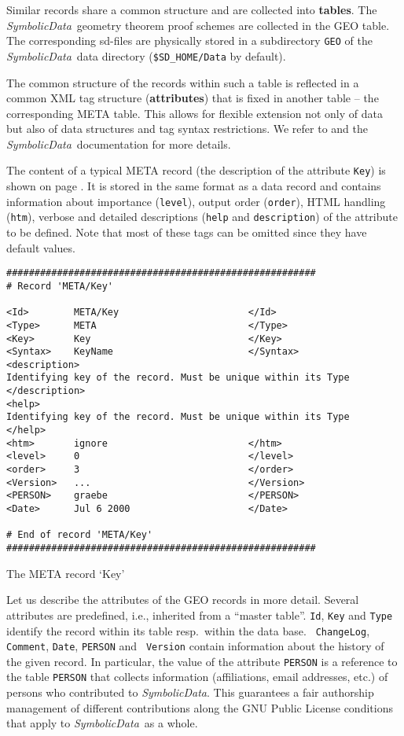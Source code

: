\documentclass[11pt]{article}
\newcommand{\SD}{{\it Symbo\-lic\-Data}}
\begin{document}
Similar records share a common structure and are collected into
{\bf tables}. The \SD\ geometry theorem proof schemes are
collected in the GEO table. The corresponding sd-files are
physically stored in a subdirectory {\tt GEO} of the \SD\ data
directory ({\tt \$SD\_HOME/Data} by default).

The common structure of the records within such a table is
reflected in a common XML tag structure ({\bf attributes}) that
is fixed in another table -- the corresponding META table. This
allows for flexible extension not only of data but also of data
structures and tag syntax restrictions.  We refer to
\cite{Bachmann_00a, karlsruhe-02} and the \SD\ documentation for
more details.  

The content of a typical META record (the description of the attribute
{\tt Key}) is shown on page \pageref{table:2}. It is stored in the
same format as a data record and contains information about importance
({\tt level}), output order ({\tt order}), HTML handling ({\tt htm}),
verbose and detailed descriptions ({\tt help} and {\tt description})
of the attribute to be defined. Note that most of these tags can be
omitted since they have default values.

\begin{table}[t]\label{table:2}{\small
\begin{verbatim}
#######################################################
# Record 'META/Key'

<Id>        META/Key                       </Id>
<Type>      META                           </Type>
<Key>       Key                            </Key>
<Syntax>    KeyName                        </Syntax>
<description>
Identifying key of the record. Must be unique within its Type
</description>
<help>
Identifying key of the record. Must be unique within its Type
</help>
<htm>       ignore                         </htm>
<level>     0                              </level>
<order>     3                              </order>
<Version>   ...                            </Version>
<PERSON>    graebe                         </PERSON>
<Date>      Jul 6 2000                     </Date>

# End of record 'META/Key'
#######################################################
\end{verbatim}}
\centerline{The META record `Key'}
\end{table}

Let us describe the attributes of the GEO records in more detail.
Several attributes are predefined, i.e., inherited from a
``master table''. {\tt Id}, {\tt Key} and {\tt Type} identify the
record within its table resp.\ within the data base.  {\tt
ChangeLog}, {\tt Comment}, {\tt Date}, {\tt PERSON} and {\tt
Version} contain information about the history of the given
record. In particular, the value of the attribute {\tt PERSON} is
a reference to the table {\tt PERSON} that collects information
(affiliations, email addresses, etc.) of persons who contributed
to \SD. This guarantees a fair authorship management of different
contributions along the GNU Public License conditions that apply
to \SD\ as a whole.
\end{document}
